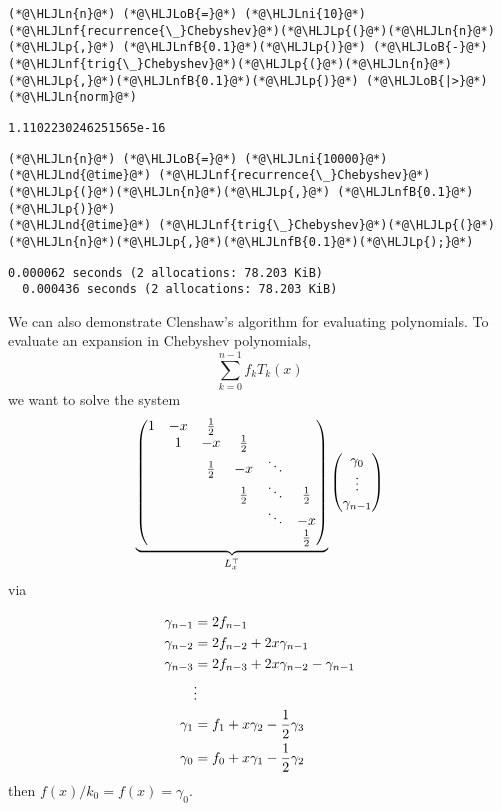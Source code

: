 \documentclass[12pt,landscape]{article}
\newcommand{\HLJLn}[1]{#1}
\newcommand{\HLJLnd}[1]{\textcolor[RGB]{214,102,97}{#1}}
\newcommand{\HLJLnf}[1]{\textcolor[RGB]{66,102,213}{#1}}
\newcommand{\HLJLnfB}[1]{\textcolor[RGB]{59,151,46}{#1}}
\newcommand{\HLJLni}[1]{\textcolor[RGB]{59,151,46}{#1}}
\newcommand{\HLJLoB}[1]{\textcolor[RGB]{102,102,102}{\textbf{#1}}}
\newcommand{\HLJLp}[1]{#1}
\def\half{ {1 \over 2} }
\begin{document}
{\begin{lstlisting}
(*@\HLJLn{n}@*) (*@\HLJLoB{=}@*) (*@\HLJLni{10}@*)
(*@\HLJLnf{recurrence{\_}Chebyshev}@*)(*@\HLJLp{(}@*)(*@\HLJLn{n}@*)(*@\HLJLp{,}@*) (*@\HLJLnfB{0.1}@*)(*@\HLJLp{)}@*) (*@\HLJLoB{-}@*) (*@\HLJLnf{trig{\_}Chebyshev}@*)(*@\HLJLp{(}@*)(*@\HLJLn{n}@*)(*@\HLJLp{,}@*)(*@\HLJLnfB{0.1}@*)(*@\HLJLp{)}@*) (*@\HLJLoB{|>}@*)(*@\HLJLn{norm}@*)
\end{lstlisting}

\begin{lstlisting}
1.1102230246251565e-16
\end{lstlisting}


\begin{lstlisting}
(*@\HLJLn{n}@*) (*@\HLJLoB{=}@*) (*@\HLJLni{10000}@*)
(*@\HLJLnd{@time}@*) (*@\HLJLnf{recurrence{\_}Chebyshev}@*)(*@\HLJLp{(}@*)(*@\HLJLn{n}@*)(*@\HLJLp{,}@*) (*@\HLJLnfB{0.1}@*)(*@\HLJLp{)}@*)
(*@\HLJLnd{@time}@*) (*@\HLJLnf{trig{\_}Chebyshev}@*)(*@\HLJLp{(}@*)(*@\HLJLn{n}@*)(*@\HLJLp{,}@*)(*@\HLJLnfB{0.1}@*)(*@\HLJLp{);}@*)
\end{lstlisting}

\begin{lstlisting}
0.000062 seconds (2 allocations: 78.203 KiB)
  0.000436 seconds (2 allocations: 78.203 KiB)
\end{lstlisting}

We can also demonstrate Clenshaw's algorithm for evaluating polynomials. To evaluate an expansion in Chebyshev polynomials,
$$
\sum_{k = 0}^{n-1}f_kT_k(x)
$$
we want to solve the system
\[
\underbrace{\begin{pmatrix}
1 & -x & \half \\
& 1 & -x & \half  \\
& & \half & -x & \ddots  \\
& &     & \half & \ddots & \half \\
&&&&\ddots & -x \\
&&&&& \half
\end{pmatrix}}_{L_x^\top} \begin{pmatrix} \gamma_0 \\\vdots\\ \gamma_{n-1} \end{pmatrix}
\]
via


\begin{align*}
\gamma_{n-1} &= 2f_{n-1} \\
\gamma_{n-2} &= 2f_{n-2} + 2x \gamma_{n-1} \\
\gamma_{n-3} &= 2 f_{n-3} + 2x \gamma_{n-2} - \gamma_{n-1} \\
& \vdots \\
\gamma_1 &= f_1 + x \gamma_2 - \half \gamma_3 \\
\gamma_0 &= f_0 + x \gamma_1 - \half \gamma_2
\end{align*}
then $f(x)/k_0 = f(x) = \gamma_0$.
\newpage

}
\end{document}
